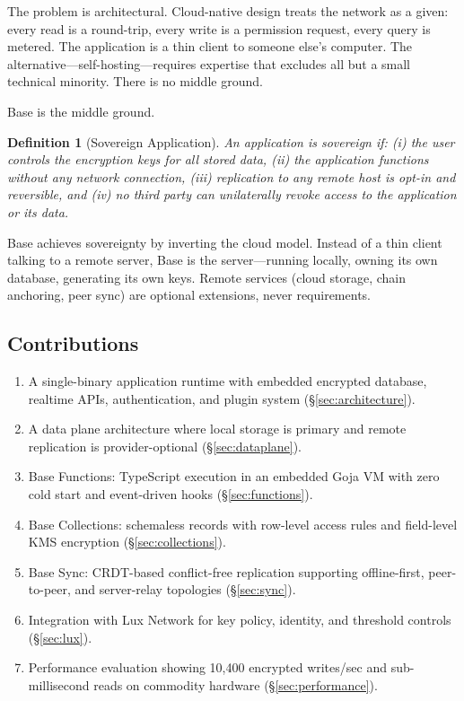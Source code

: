 \documentclass[11pt]{article}
\newtheorem{definition}{Definition}
\begin{document}
The problem is architectural. Cloud-native design treats the network as a given:
every read is a round-trip, every write is a permission request, every query is
metered. The application is a thin client to someone else's computer. The
alternative---self-hosting---requires expertise that excludes all but a small
technical minority. There is no middle ground.

Base is the middle ground.

\begin{definition}[Sovereign Application]
An application is sovereign if: (i) the user controls the encryption keys for
all stored data, (ii) the application functions without any network connection,
(iii) replication to any remote host is opt-in and reversible, and (iv) no
third party can unilaterally revoke access to the application or its data.
\end{definition}

Base achieves sovereignty by inverting the cloud model. Instead of a thin
client talking to a remote server, Base is the server---running locally, owning
its own database, generating its own keys. Remote services (cloud storage, chain
anchoring, peer sync) are optional extensions, never requirements.

\subsection{Contributions}

\begin{enumerate}[leftmargin=1.4em]
    \item A single-binary application runtime with embedded encrypted database,
    realtime APIs, authentication, and plugin system
    (\S\ref{sec:architecture}).
    \item A data plane architecture where local storage is primary and remote
    replication is provider-optional (\S\ref{sec:dataplane}).
    \item Base Functions: TypeScript execution in an embedded Goja VM with
    zero cold start and event-driven hooks (\S\ref{sec:functions}).
    \item Base Collections: schemaless records with row-level access rules and
    field-level KMS encryption (\S\ref{sec:collections}).
    \item Base Sync: CRDT-based conflict-free replication supporting
    offline-first, peer-to-peer, and server-relay topologies
    (\S\ref{sec:sync}).
    \item Integration with Lux Network for key policy, identity, and threshold
    controls (\S\ref{sec:lux}).
    \item Performance evaluation showing 10,400 encrypted writes/sec and
    sub-millisecond reads on commodity hardware (\S\ref{sec:performance}).
\end{enumerate}
\end{document}
